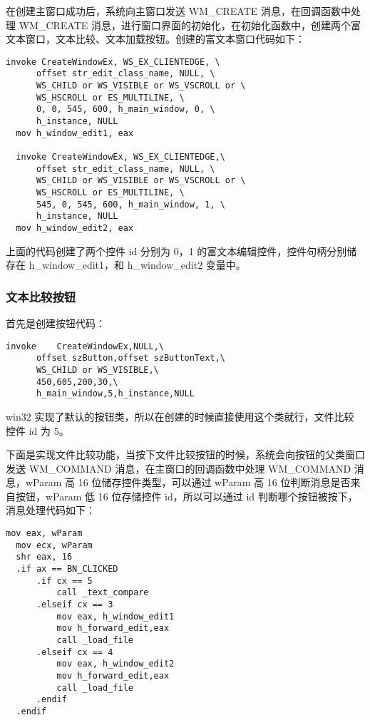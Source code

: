 \documentclass[proposal-report]{bitart}
\begin{document}
在创建主窗口成功后，系统向主窗口发送 WM\_CREATE 消息，在回调函数中处理 WM\_CREATE 消息，进行窗口界面的初始化，在初始化函数中，创建两个富文本窗口，文本比较、文本加载按钮。创建的富文本窗口代码如下：

\begin{lstlisting}[language={[x86masm]Assembler}]
  invoke CreateWindowEx, WS_EX_CLIENTEDGE, \
      offset str_edit_class_name, NULL, \
      WS_CHILD or WS_VISIBLE or WS_VSCROLL or \
      WS_HSCROLL or ES_MULTILINE, \
      0, 0, 545, 600, h_main_window, 0, \
      h_instance, NULL
  mov h_window_edit1, eax

  invoke CreateWindowEx, WS_EX_CLIENTEDGE,\
      offset str_edit_class_name, NULL, \
      WS_CHILD or WS_VISIBLE or WS_VSCROLL or \
      WS_HSCROLL or ES_MULTILINE, \
      545, 0, 545, 600, h_main_window, 1, \
      h_instance, NULL
  mov h_window_edit2, eax
\end{lstlisting}

上面的代码创建了两个控件 id 分别为 0，1 的富文本编辑控件，控件句柄分别储存在 h\_window\_edit1，和 h\_window\_edit2 变量中。

\subsubsection{文本比较按钮}

首先是创建按钮代码：

\begin{lstlisting}[language={[x86masm]Assembler}]
  invoke	CreateWindowEx,NULL,\
      offset szButton,offset szButtonText,\
      WS_CHILD or WS_VISIBLE,\
      450,605,200,30,\
      h_main_window,5,h_instance,NULL
\end{lstlisting}

win32 实现了默认的按钮类，所以在创建的时候直接使用这个类就行，文件比较 控件 id 为 5。

下面是实现文件比较功能，当按下文件比较按钮的时候，系统会向按钮的父类窗口发送 WM\_COMMAND 消息，在主窗口的回调函数中处理 WM\_COMMAND 消息，wParam 高 16 位储存控件类型，可以通过 wParam 高 16 位判断消息是否来自按钮，wParam 低 16 位存储控件 id，所以可以通过 id 判断哪个按钮被按下，消息处理代码如下：

\begin{lstlisting}[language={[x86masm]Assembler}]
  mov eax, wParam
  mov ecx, wParam
  shr eax, 16
  .if ax == BN_CLICKED
      .if cx == 5
          call _text_compare
      .elseif cx == 3
          mov eax, h_window_edit1 
          mov h_forward_edit,eax 
          call _load_file
      .elseif cx == 4
          mov eax, h_window_edit2
          mov h_forward_edit,eax
          call _load_file
      .endif
  .endif
\end{lstlisting}
\end{document}
